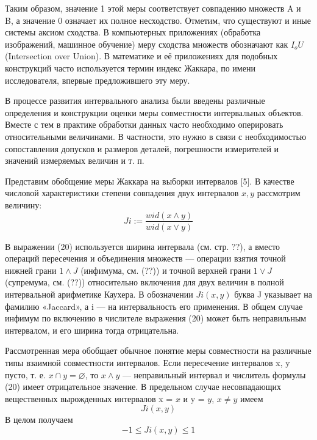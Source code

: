 \documentclass[a4paper,14pt]{article}
\begin{document}
	Таким образом, значение 1 этой меры соответствует совпадению множеств A
	и B, а значение 0 означает их полное несходство. Отметим, что существуют
	и иные системы аксиом сходства. В компьютерных приложениях (обработка
	изображений, машинное обучение) меру сходства множеств обозначают как $I_{o}U$
	(Intersection over Union). В математике и её приложениях для подобных конструкций часто используется термин индекс Жаккара, по имени исследователя,
	впервые предложившего эту меру.
	
	В процессе развития интервального анализа были введены различные определения и конструкции оценки меры совместности интервальных объектов. Вместе с тем в практике обработки данных часто необходимо оперировать относительными величинами. В частности, это нужно в связи с необходимостью сопоставления допусков и размеров деталей, погрешности измерителей и значений
	измеряемых величин и т. п.
	
	Представим обобщение меры Жаккара на выборки интервалов [5]. В качестве
	числовой характеристики степени совпадения двух интервалов $x, y$ рассмотрим величину:
	\begin{equation}
		Ji := \frac{wid(x \wedge y)}{wid(x \vee y)}
	\end{equation}

	В выражении (20) используется ширина интервала (см. стр. ??), а вместо операций пересечения и объединения множеств — операции взятия точной нижней
	грани $1  \wedge J$ (инфимума, см. (??)) и точной верхней грани $1 \vee J$ (супремума, см. (??))
	относительно включения для двух величин в полной интервальной арифметике
	Каухера. В обозначении $J i(x, y)$ буква J указывает на фамилию «Jaccard», а
	i — на интервальность его применения. В общем случае инфимум по включению в числителе выражения (20) может быть неправильным интервалом, и его
	ширина тогда отрицательна.
	
	Рассмотренная мера обобщает обычное понятие меры совместности на различные типы взаимной совместности интервалов. Если пересечение интервалов
	x, y пусто, т. е. $x \cap y = \varnothing$, то $x \wedge y$ — неправильный интервал и числитель формулы (20) имеет отрицательное значение. В предельном случае несовпадающих
	вещественных вырожденных интервалов x = $x$ и y = $y$, $x \neq y$  имеем
	\begin{equation*}
		Ji(x,y)
	\end{equation*}
	В целом получаем
	\begin{equation}
		-1 \leq Ji(x,y) \leq 1
	\end{equation}
\end{document}

